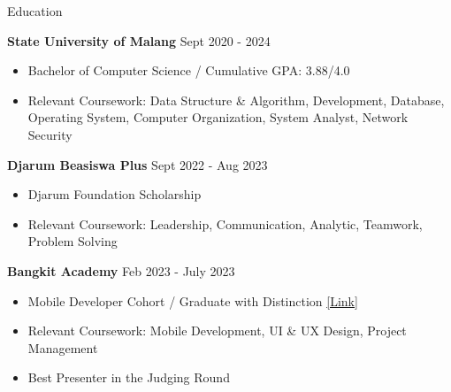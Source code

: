 \documentclass{resume} %
\begin{document}

\vspace{0.8em}
\begin{rSection}{Education}

{\bf State University of Malang} \hfill {Sept 2020 - 2024}
\vspace{-0.75em}
\begin{itemize}
\itemsep -7pt {}
\item Bachelor of Computer Science / Cumulative GPA: 3.88/4.0
\item Relevant Coursework: Data Structure \& Algorithm, Development, Database, Operating System, Computer Organization, System Analyst, Network Security  
 \end{itemize}
 \vspace{-0.5em}
 
 {\bf Djarum Beasiswa Plus} \hfill {Sept 2022 - Aug 2023}
\vspace{-0.75em}
\begin{itemize}
\itemsep -7pt {}
\item Djarum Foundation Scholarship
\item Relevant Coursework: Leadership, Communication, Analytic, Teamwork, Problem Solving
 \end{itemize}
 \vspace{-0.5em}
 
 {\bf Bangkit Academy} \hfill {Feb 2023 - July 2023}
\vspace{-0.75em}
\begin{itemize}
\itemsep -7pt {}
\item Mobile Developer Cohort / Graduate with Distinction \href{https://drive.google.com/file/d/1FiU1ONEX-gH2JZHKMGJ98xOr-tF1RwPK/view?usp=drive_link}{[Link]}
\item Relevant Coursework: Mobile Development, UI \& UX Design, Project Management
\item Best Presenter in the Judging Round
 \end{itemize}
 \vspace{-0.5em}

\end{rSection}
\end{document}
